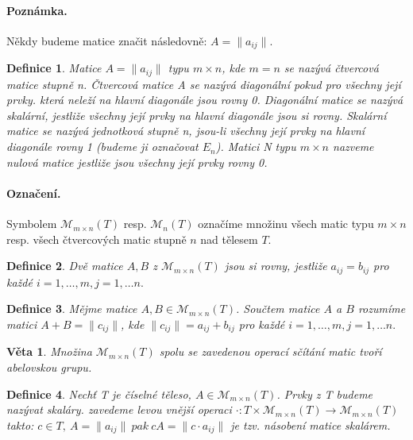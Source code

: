 \documentclass[12pt,a4paper]{article}
\newtheorem{definition}{Definice}
\newtheorem{sentence}{Věta}
\begin{document}
\paragraph{Poznámka.} Někdy budeme matice značit následovně: $A = \| a_{ij}\|$.

\begin{definition}
	Matice $A = \|a_{ij}\|$ typu $m \times n$, kde $m = n$ se nazývá čtvercová matice stupně n. Čtvercová matice A se nazývá diagonální pokud pro všechny její prvky. která neleží na hlavní diagonále jsou rovny 0. Diagonální matice se nazývá skalární, jestliže všechny její prvky na hlavní diagonále jsou si rovny. Skalární matice se nazývá jednotková stupně n, jsou-li všechny její prvky na hlavní diagonále rovny 1 (budeme ji označovat $E_n$). Matici N typu $m \times n$ nazveme nulová matice jestliže jsou všechny její prvky rovny 0.
\end{definition}

\paragraph{Označení.} Symbolem $\mathscr{M}_{m \times n}(T)$ resp. $\mathscr{M}_{n}(T)$ označíme množinu všech matic typu $m \times n$ resp. všech čtvercových matic stupně $n$ nad tělesem $T$.

\begin{definition}
	Dvě matice $A,B$ z $\mathscr{M}_{m \times n}(T)$ jsou si rovny, jestliže $a_{ij} = b_{ij}$ pro každé  $i = 1, \dots, m, j = 1, \dots n.$
\end{definition}

\begin{definition}
	Mějme matice $A,B \in \mathscr{M}_{m \times n}(T)$. Součtem matice $A$ a $B$ rozumíme matici $A + B = \|c_{ij}\|$, kde $ \|c_{ij}\| =  a_{ij} + b_{ij}$ pro každé $i = 1, \dots, m, j = 1, \dots n.$
\end{definition}

\begin{sentence}
	Množina $\mathscr{M}_{m \times n}(T)$ spolu se zavedenou operací sčítání matic tvoří abelovskou grupu.
\end{sentence}
\begin{definition}
	Nechť T je číselné těleso, $A \in \mathscr{M}_{m \times n}(T)$. Prvky z T budeme nazývat skaláry. zavedeme levou vnější operaci $\cdot : T \times  \mathscr{M}_{m \times n}(T) \rightarrow \mathscr{M}_{m \times n}(T)$ takto: $c \in T, \ A= \| a_{ij} \| \ pak \ cA = \|c \cdot a_{ij} \|$ je tzv. násobení matice skalárem.
\end{definition}
\end{document}
